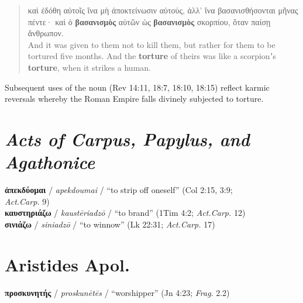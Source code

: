 \vspace*{2mm} 
 \begin{quote}καὶ ἐδόθη αὐτοῖς ἵνα μὴ ἀποκτείνωσιν αὐτούς, %
ἀλλ’ ἵνα βασανισθήσονται μῆνας πέντε· καὶ ὁ \textbf{βασανισμὸς} %
 αὐτῶν ὡς \textbf{βασανισμὸς} σκορπίου, ὅταν παίσῃ ἄνθρωπον. \\[1mm] %
 And it was given to them not to kill them, but rather for them to be tortured five months. %
 And the \textbf{torture} of theirs was like a scorpionʼs \textbf{torture}, %
 when it strikes a human. %
 \end{quote} %
\vspace*{2mm} 

\noindent{}Subsequent uses of the noun (Rev 14:11, 18:7, 18:10, 18:15) reflect karmic reversals %
whereby the Roman Empire falls divinely subjected to torture. \\[1mm] %

\section{\textit{Acts of Carpus, Papylus, and Agathonice}}

\noindent{}\textbf{ἀπεκδύομαι} / \textit{apekdoumai} / “to strip off oneself” (Col 2:15, 3:9; \\ %
 \makebox[3em][l]{} \textit{Act.Carp.} 9) \\[0.4mm] %
%
\noindent{}\textbf{καυστηριάζω} / \textit{kaustēriadzō} / “to brand” (1Tim 4:2; \textit{Act.Carp.} 12) \\[0.4mm] %
\noindent{}\textbf{σινιάζω} / \textit{siniadzō} / “to winnow” (Lk 22:31; \textit{Act.Carp.} 17) %
\\[1mm] %

\section{Aristides Apol.}

\noindent{}\textbf{προσκυνητής} / \textit{proskunētēs} / “worshipper” (Jn 4:23; \textit{Frag}. 2.2) \\[1mm] %

